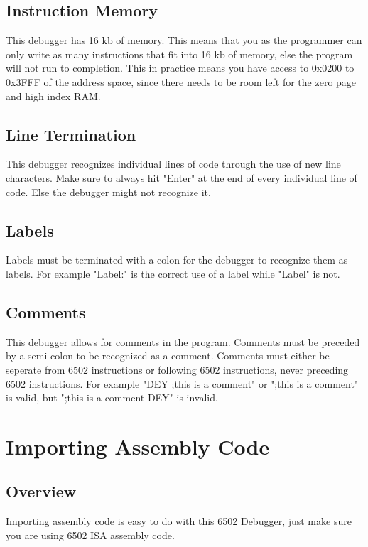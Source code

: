 \documentclass[a3paper, 11pt]{article}
\begin{document}
\subsection{Instruction Memory}
This debugger has 16 kb of memory. This means that you as the programmer can only write as many instructions that fit into 16 kb of memory, else the program will not run to completion. This in practice means you have access to 0x0200 to 0x3FFF of the address space, since there needs to be room left for the zero page and high index RAM.
\subsection{Line Termination}
This debugger recognizes individual lines of code through the use of new line characters. Make sure to always hit "Enter" at the end of every individual line of code. Else the debugger might not recognize it.
\subsection{Labels}
Labels must be terminated with a colon for the debugger to recognize them as labels. For example "Label:" is the correct use of a label while "Label" is not. 
\subsection{Comments}
This debugger allows for comments in the program. Comments must be preceded by a semi colon to be recognized as a comment. Comments must either be seperate from 6502 instructions or following 6502 instructions, never preceding 6502 instructions. For example "DEY ;this is a comment" or ";this is a comment" is valid, but ";this is a comment DEY" is invalid.
\pagebreak

\section{Importing Assembly Code}
\subsection{Overview}
Importing assembly code is easy to do with this 6502 Debugger, just make sure you are using 6502 ISA assembly code.
\end{document}
